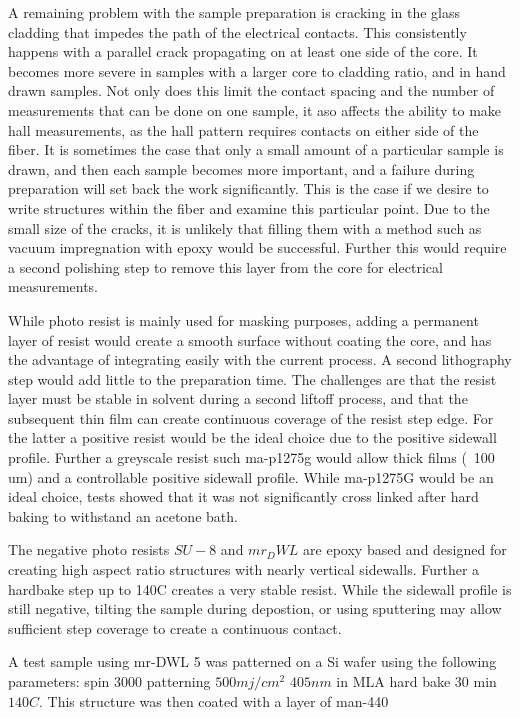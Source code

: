 A remaining problem with the sample preparation is cracking in the glass cladding that impedes the path of the electrical contacts. This consistently happens with a parallel crack propagating on at least one side of the core. It becomes more severe in samples with a larger core to cladding ratio, and in hand drawn samples. Not only does this limit the contact spacing and the number of measurements that can be done on one sample, it aso affects the ability to make hall measurements, as the hall pattern requires contacts on either side of the fiber. It is sometimes the case that only a small amount of a particular sample is drawn, and then each sample becomes more important, and a failure during preparation will set back the work significantly. This is the case if we desire to write structures within the fiber and examine this particular point. Due to the small size of the cracks, it is unlikely that filling them with a method such as vacuum impregnation with epoxy would be successful. Further this would require a second polishing step to remove this layer from the core for electrical measurements.

While photo resist is mainly used for masking purposes, adding a permanent layer of resist would create a smooth surface without coating the core, and has the advantage of integrating easily with the current process. A second lithography step would add little to the preparation time. The challenges are that the resist layer must be stable in solvent during a second liftoff process, and that the subsequent thin film can create continuous coverage of the resist step edge. For the latter a positive resist would be the ideal choice due to the positive sidewall profile. Further a greyscale resist such ma-p1275g  would allow thick films (~100 um) and a controllable positive sidewall profile. While ma-p1275G would be an ideal choice, tests showed that it was not significantly cross linked after hard baking to withstand an acetone bath. 

The negative photo resists $SU-8$ and $mr_DWL$ are epoxy based and designed for creating high aspect ratio structures with nearly vertical sidewalls. Further a hardbake step up to 140C creates a very stable resist. While the sidewall profile is still negative, tilting the sample during depostion, or using sputtering may allow sufficient step coverage to create a continuous contact. 



A test sample using mr-DWL 5 was patterned on a Si wafer using the following parameters: spin 3000 patterning $500 mj/cm^2$ $405nm$ in MLA hard bake 30 min $140C$. This structure was then coated with a layer of man-440 



